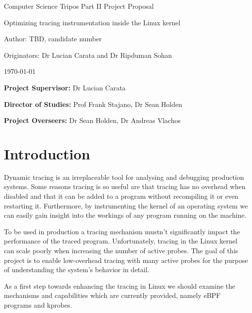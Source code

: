\centerline{\Large Computer Science Tripos \textendash{} Part II \textendash{} Project Proposal}
\vspace{6mm}
\centerline{\Large Optimizing tracing instrumentation inside the Linux kernel}
\vspace{6mm}
\centerline{\large Author: TBD, candidate number}
\vspace{4mm}
\centerline{\large Originators: Dr Lucian Carata and Dr Ripduman Sohan}
\vspace{4mm}
\centerline{\large \today}

\vspace{8mm}

\noindent
{\bf Project Supervisor:} Dr Lucian Carata
\vspace{2mm}

\noindent
{\bf Director of Studies:} Prof Frank Stajano, Dr Sean Holden
\vspace{2mm}
 
\noindent
{\bf Project Overseers:} Dr Sean Holden, Dr Andreas Vlachos

\newcommand{\kamprobe}[1]{\texttt{#1}}


\section*{Introduction}

    Dynamic tracing is an irreplaceable tool for analysing and debugging production systems. 
    Some reasons tracing is so useful are that tracing has no overhead 
    when disabled and that it can be added to a program without recompiling it or even restarting it. 
    Furthermore, by instrumenting the kernel of an operating system we can easily gain insight into
    the workings of any program running on the machine.

    To be used in production a tracing mechanism mustn't significantly impact the performance of the 
    traced program. Unfortunately, tracing in the Linux kernel can scale poorly when increasing the number of active probes.
    The goal of this project is to enable low-overhead tracing with many active probes for the purpose of
    understanding the system's behavior in detail.

    As a first step towards enhancing the tracing in Linux we should examine the mechanisms and capabilities
    which are currently provided, namely eBPF programs and kprobes.

